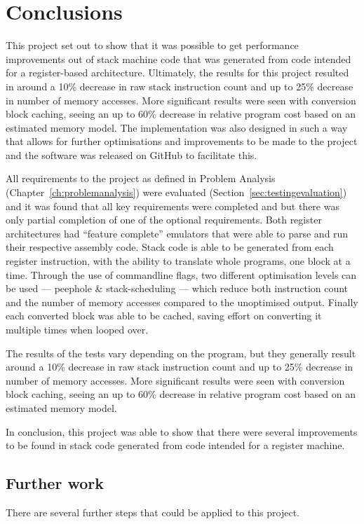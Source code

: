 \chapter{Conclusions}\label{ch:conclusions}
This project set out to show that it was possible to get performance
improvements out of stack machine code that was generated from code intended for
a register-based architecture. Ultimately, the results for this project resulted
in around a 10\% decrease in raw stack instruction count and up to 25\% decrease
in number of memory accesses. More significant results were seen with conversion
block caching, seeing an up to 60\% decrease in relative program cost based on
an estimated memory model. The implementation was also designed in such a way
that allows for further optimisations and improvements to be made to the
project and the software was released on GitHub to facilitate this.

All requirements to the project as defined in Problem Analysis
(Chapter~\ref{ch:problemanalysis}) were evaluated
(Section~\ref{sec:testingevaluation}) and it was found that all key requirements
were completed and but there was only partial completion of one of the optional
requirements. Both register architectures had ``feature complete'' emulators
that were able to parse and run their respective assembly code. Stack code is
able to be generated from each register instruction, with the ability to
translate whole programs, one block at a time. Through the use of commandline
flags, two different optimisation levels can be used --- peephole \&
stack-scheduling --- which reduce both instruction count and the number of
memory accesses compared to the unoptimised output.  Finally each converted
block was able to be cached, saving effort on converting it multiple times when
looped over.

The results of the tests vary depending on the program, but they generally
result around a 10\% decrease in raw stack instruction count and up to 25\%
decrease in number of memory accesses. More significant results were seen with
conversion block caching, seeing an up to 60\% decrease in relative program cost
based on an estimated memory model.

In conclusion, this project was able to show that there were several
improvements to be found in stack code generated from code intended for a
register machine.

\section{Further work}\label{sec:furtherwork}
There are several further steps that could be applied to this project.

